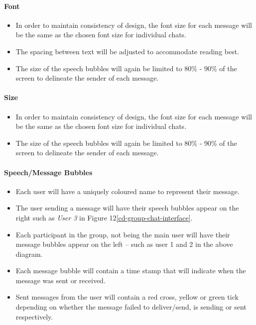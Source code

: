 \documentclass[11pt]{article}
\begin{document}
\paragraph{Font}
\begin{itemize}
\item	In order to maintain consistency of design, the font size for each message will be the same as the chosen font size for individual chats.
\item The spacing between text will be adjusted to accommodate reading best.
\item	The size of the speech bubbles will again be limited to 80\% - 90\% of the screen to delineate the sender of each message. \\
\end{itemize}

\paragraph{Size}
\begin{itemize}
\item	In order to maintain consistency of design, the font size for each message will be the same as the chosen font size for individual chats.
\item	The size of the speech bubbles will again be limited to 80\% - 90\% of the screen to delineate the sender of each message. \\
\end{itemize}

\paragraph{Speech/Message Bubbles}
\begin{itemize}
\item	Each user will have a uniquely coloured name to represent their message.
\item	The user sending a message will have their speech bubbles appear on the right such as \textit{User 3} in Figure 12\ref{cd-group-chat-interface}.
\item	Each participant in the group, not being the main user will have their message bubbles appear on the left – such as user 1 and 2 in the above diagram.
\item Each message bubble will contain a time stamp that will indicate when the message was sent or received.
\item Sent messages from the user will contain a red cross, yellow or green tick depending on whether the message failed to deliver/send, is sending or sent respectively.\\
\end{itemize}
\end{document}
